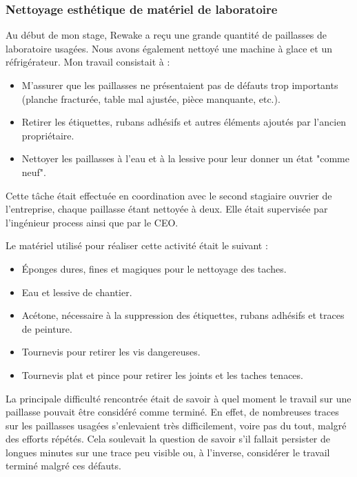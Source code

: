 \documentclass{rapportENSCP}
\begin{document}
\subsubsection{Nettoyage esthétique de matériel de laboratoire}
\label{subsubsec:paillasse}
Au début de mon stage, Rewake a reçu une grande quantité de paillasses de laboratoire usagées. Nous avons également nettoyé une machine à glace et un réfrigérateur. Mon travail consistait à :

\begin{itemize}
    \item M'assurer que les paillasses ne présentaient pas de défauts trop importants (planche fracturée, table mal ajustée, pièce manquante, etc.).
    \item Retirer les étiquettes, rubans adhésifs et autres éléments ajoutés par l'ancien propriétaire.
    \item Nettoyer les paillasses à l'eau et à la lessive pour leur donner un état "comme neuf".
\end{itemize}

Cette tâche était effectuée en coordination avec le second stagiaire ouvrier de l'entreprise, chaque paillasse étant nettoyée à deux. Elle était supervisée par l'ingénieur process ainsi que par le CEO.

Le matériel utilisé pour réaliser cette activité était le suivant :
\begin{itemize}
    \item Éponges dures, fines et magiques pour le nettoyage des taches.
    \item Eau et lessive de chantier.
    \item Acétone, nécessaire à la suppression des étiquettes, rubans adhésifs et traces de peinture.
    \item Tournevis pour retirer les vis dangereuses.
    \item Tournevis plat et pince pour retirer les joints et les taches tenaces.
\end{itemize}

La principale difficulté rencontrée était de savoir à quel moment le travail sur une paillasse pouvait être considéré comme terminé. En effet, de nombreuses traces sur les paillasses usagées s'enlevaient très difficilement, voire pas du tout, malgré des efforts répétés. Cela soulevait la question de savoir s'il fallait persister de longues minutes sur une trace peu visible ou, à l'inverse, considérer le travail terminé malgré ces défauts.
\end{document}
